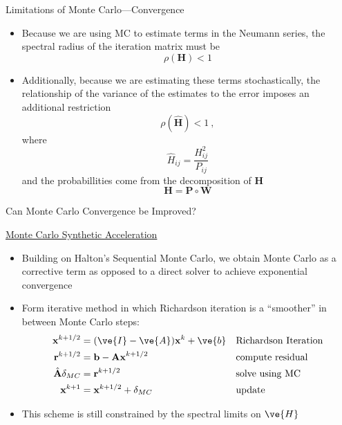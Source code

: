 \documentclass{beamer}
\begin{document}

\begin{frame}{Limitations of Monte Carlo---Convergence}
  
  \begin{itemize}
  \item Because we are using MC to estimate terms in the Neumann series, the
    spectral radius of the iteration matrix must be
    \[
    \rho(\mathbf{H}) < 1
    \]

  \item Additionally, because we are estimating these terms stochastically,
    the relationship of the variance of the estimates to the error imposes an
    additional restriction 
    \[
    \rho(\hat{\mathbf{H}}) < 1\:, 
    \]
    where 
    \[
    \hat{H}_{ij} = \frac{H_{ij}^2}{P_{ij}}
    \]
    and the probabillities come from the decomposition of $\mathbf{H}$
    \[
    \mathbf{H} = \mathbf{P}\circ\mathbf{W}
    \]
  \end{itemize}
\end{frame}


\begin{frame}{Can Monte Carlo Convergence be Improved?}

  \underline{Monte Carlo Synthetic Acceleration}
  \vfill
  \begin{itemize}
  \item Building on Halton's Sequential Monte Carlo, we obtain Monte Carlo as
    a corrective term as opposed to a direct solver to achieve exponential
    convergence
  \item Form iterative method in which Richardson iteration is a ``smoother''
    in between Monte Carlo steps:
    \begin{align*}
      \mathbf{x}^{k+1/2} &= (\ve{I} - \ve{A})\mathbf{x}^k + \ve{b} 
      && \text{Richardson Iteration}\\
      \mathbf{r}^{k+1/2} &= \mathbf{b} - \mathbf{Ax}^{k+1/2} && 
      \text{compute residual}\\
      \hat{\mathbf{A}} \mathbf{\delta}_{MC} &= \mathbf{r}^{k+1/2}
      && \text{solve using MC}\\
      \mathbf{x}^{k+1} &= \mathbf{x}^{k+1/2} + \delta_{MC} 
      && \text{update} 
    \end{align*}
  \item This scheme is still constrained by the spectral limits on $\ve{H}$
  \end{itemize}
  \vfill\centering

\end{frame}
\end{document}
